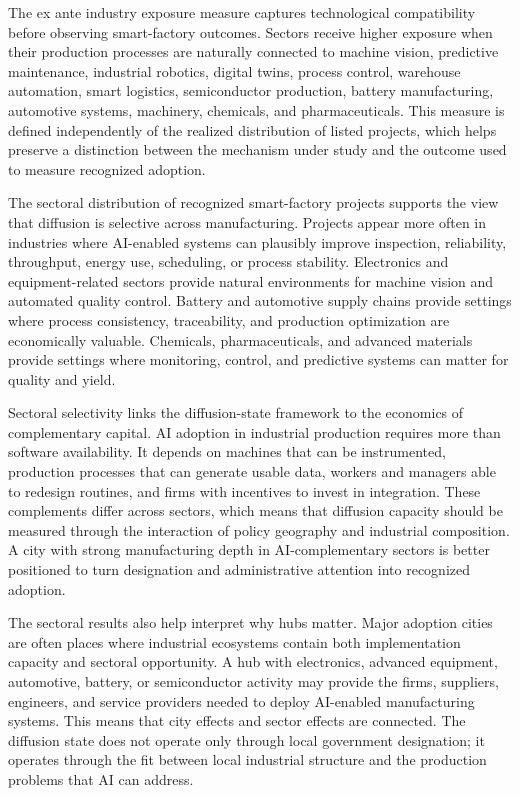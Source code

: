 \documentclass[12pt]{article}
\begin{document}
The ex ante industry exposure measure captures technological compatibility before observing smart-factory outcomes. Sectors receive higher exposure when their production processes are naturally connected to machine vision, predictive maintenance, industrial robotics, digital twins, process control, warehouse automation, smart logistics, semiconductor production, battery manufacturing, automotive systems, machinery, chemicals, and pharmaceuticals. This measure is defined independently of the realized distribution of listed projects, which helps preserve a distinction between the mechanism under study and the outcome used to measure recognized adoption.

The sectoral distribution of recognized smart-factory projects supports the view that diffusion is selective across manufacturing. Projects appear more often in industries where AI-enabled systems can plausibly improve inspection, reliability, throughput, energy use, scheduling, or process stability. Electronics and equipment-related sectors provide natural environments for machine vision and automated quality control. Battery and automotive supply chains provide settings where process consistency, traceability, and production optimization are economically valuable. Chemicals, pharmaceuticals, and advanced materials provide settings where monitoring, control, and predictive systems can matter for quality and yield.

Sectoral selectivity links the diffusion-state framework to the economics of complementary capital. AI adoption in industrial production requires more than software availability. It depends on machines that can be instrumented, production processes that can generate usable data, workers and managers able to redesign routines, and firms with incentives to invest in integration. These complements differ across sectors, which means that diffusion capacity should be measured through the interaction of policy geography and industrial composition. A city with strong manufacturing depth in AI-complementary sectors is better positioned to turn designation and administrative attention into recognized adoption.

The sectoral results also help interpret why hubs matter. Major adoption cities are often places where industrial ecosystems contain both implementation capacity and sectoral opportunity. A hub with electronics, advanced equipment, automotive, battery, or semiconductor activity may provide the firms, suppliers, engineers, and service providers needed to deploy AI-enabled manufacturing systems. This means that city effects and sector effects are connected. The diffusion state does not operate only through local government designation; it operates through the fit between local industrial structure and the production problems that AI can address.
\end{document}
